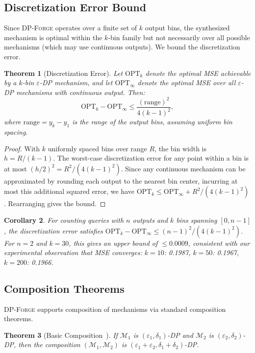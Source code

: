 \documentclass[11pt,a4paper]{article}
\newcommand{\dpforge}{\textsc{DP-Forge}}
\newcommand{\eps}{\varepsilon}
\newcommand{\cM}{\mathcal{M}}
\newtheorem{theorem}{Theorem}[section]
\newtheorem{corollary}[theorem]{Corollary}
\begin{document}
\subsection{Discretization Error Bound}
\label{subsec:discretization}

Since \dpforge{} operates over a finite set of $k$ output bins, the synthesized
mechanism is optimal within the $k$-bin family but not necessarily over all
possible mechanisms (which may use continuous outputs).  We bound the
discretization error.

\begin{theorem}[Discretization Error]
\label{thm:discretization}
Let $\text{OPT}_k$ denote the optimal MSE achievable by a $k$-bin $\eps$-DP
mechanism, and let $\text{OPT}_\infty$ denote the optimal MSE over all
$\eps$-DP mechanisms with continuous output.  Then:
\[
  \text{OPT}_k - \text{OPT}_\infty \le \frac{(\text{range})^2}{4(k-1)^2},
\]
where $\text{range} = y_k - y_1$ is the range of the output bins, assuming
uniform bin spacing.
\end{theorem}

\begin{proof}
With $k$ uniformly spaced bins over range $R$, the bin width is $h = R/(k-1)$.
The worst-case discretization error for any point within a bin is at most
$(h/2)^2 = R^2/(4(k-1)^2)$.  Since any continuous mechanism can be approximated
by rounding each output to the nearest bin center, incurring at most this
additional squared error, we have
$\text{OPT}_k \le \text{OPT}_\infty + R^2/(4(k-1)^2)$.
Rearranging gives the bound.
\end{proof}

\begin{corollary}
For counting queries with $n$ outputs and $k$ bins spanning $[0, n-1]$, the
discretization error satisfies
$\text{OPT}_k - \text{OPT}_\infty \le (n-1)^2 / (4(k-1)^2)$.
For $n = 2$ and $k = 30$, this gives an upper bound of $\le 0.0009$, consistent
with our experimental observation that MSE converges: $k=10$: 0.1987, $k=50$:
0.1967, $k=200$: 0.1966.
\end{corollary}

\subsection{Composition Theorems}
\label{subsec:composition}

\dpforge{} supports composition of mechanisms via standard composition theorems.

\begin{theorem}[Basic Composition~\cite{dwork2014algorithmic}]
\label{thm:basic_comp}
If $\cM_1$ is $(\eps_1, \delta_1)$-DP and $\cM_2$ is $(\eps_2, \delta_2)$-DP,
then the composition $(\cM_1, \cM_2)$ is
$(\eps_1 + \eps_2, \delta_1 + \delta_2)$-DP.
\end{theorem}
\end{document}
